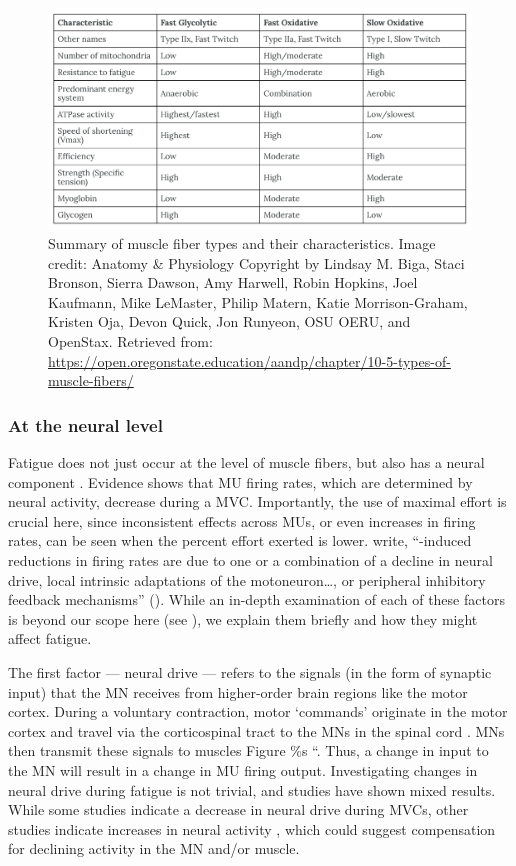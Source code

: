 \documentclass{article}
\begin{document}
\begin{figure}[!htbp]
\centering
\includegraphics[width=0.9\linewidth]{files/EPpXta8zJdzN048lz8AR-567ef09ff4b90fa51e2af0e3c5e177bf.png}
\caption[]{Summary of muscle fiber types and their characteristics. Image credit: Anatomy \& Physiology Copyright  by Lindsay M. Biga, Staci Bronson, Sierra Dawson, Amy Harwell, Robin Hopkins, Joel Kaufmann, Mike LeMaster, Philip Matern, Katie Morrison-Graham, Kristen Oja, Devon Quick, Jon Runyeon, OSU OERU, and OpenStax. Retrieved from: \href{https://open.oregonstate.education/aandp/chapter/10-5-types-of-muscle-fibers/}{https://open.oregonstate.education/aandp/chapter/10-5-types-of-muscle-fibers/}}
\label{n9KlNIgbBP}
\end{figure}

\subsubsection{At the neural level}

Fatigue does not just occur at the level of muscle fibers, but also has a neural component \citep{taylor2016neural}. Evidence shows that MU firing rates, which are determined by neural activity, decrease during a MVC. Importantly, the use of maximal effort is crucial here, since inconsistent effects across MUs, or even increases in firing rates, can be seen when the percent effort exerted is lower. \citet{taylor2016neural} write, ``\dotsfatigue-induced reductions in firing rates are due to one or a combination of a decline in neural drive, local intrinsic adaptations of the motoneuron\dots, or peripheral inhibitory feedback mechanisms'' (). While an in-depth examination of each of these factors is beyond our scope here (see ), we explain them briefly and how they might affect fatigue.

The first factor --- neural drive --- refers to the signals (in the form of synaptic input) that the MN receives from higher-order brain regions like the motor cortex. During a voluntary contraction, motor `commands' originate in the motor cortex and travel via the corticospinal tract to the MNs in the spinal cord \citep{natali}. MNs then transmit these signals to muscles \citep{}Figure \%s ``. Thus, a change in input to the MN will result in a change in MU firing output. Investigating changes in neural drive during fatigue is not trivial, and studies have shown mixed results. While some studies indicate a decrease in neural drive during MVCs, other studies indicate increases in neural activity \citep{taylor2016neural}, which could suggest compensation for declining activity in the MN and/or muscle.
\end{document}
